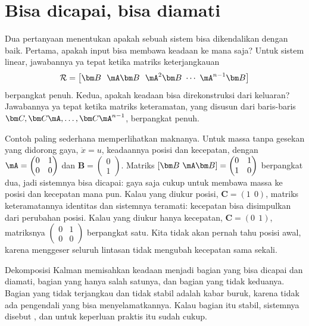 \section{Bisa dicapai, bisa diamati}

Dua pertanyaan menentukan apakah sebuah sistem bisa dikendalikan dengan baik. Pertama, apakah input bisa
membawa keadaan ke mana saja? Untuk sistem linear, jawabannya ya tepat ketika matriks keterjangkauan
\begin{equation}
\mathcal R=\big[\bm B\ \ \mA\bm B\ \ \mA^2\bm B\ \cdots\ \mA^{n-1}\bm B\big]
\end{equation}
berpangkat penuh. Kedua, apakah keadaan bisa direkonstruksi dari keluaran? Jawabannya ya tepat ketika matriks
keteramatan, yang disusun dari baris-baris $\bm C,\bm C\mA,\dots,\bm C\mA^{n-1}$, berpangkat penuh.

Contoh paling sederhana memperlihatkan maknanya. Untuk massa tanpa gesekan yang didorong gaya, $\ddot x=u$,
keadaannya posisi dan kecepatan, dengan
$\mA=\begin{pmatrix}0&1\\0&0\end{pmatrix}$ dan $\bm B=\begin{pmatrix}0\\1\end{pmatrix}$. Matriks
$[\bm B\ \mA\bm B]=\begin{pmatrix}0&1\\1&0\end{pmatrix}$ berpangkat dua, jadi sistemnya bisa dicapai: gaya
saja cukup untuk membawa massa ke posisi dan kecepatan mana pun. Kalau yang diukur posisi,
$\bm C=(1\ \ 0)$, matriks keteramatannya identitas dan sistemnya teramati: kecepatan bisa disimpulkan dari
perubahan posisi. Kalau yang diukur hanya kecepatan, $\bm C=(0\ \ 1)$, matriksnya
$\begin{pmatrix}0&1\\0&0\end{pmatrix}$ berpangkat satu. Kita tidak akan pernah tahu posisi awal, karena
menggeser seluruh lintasan tidak mengubah kecepatan sama sekali.

Dekomposisi Kalman memisahkan keadaan menjadi bagian yang bisa dicapai dan diamati, bagian yang hanya salah
satunya, dan bagian yang tidak keduanya. Bagian yang tidak terjangkau dan tidak stabil adalah kabar buruk,
karena tidak ada pengendali yang bisa menyelamatkannya. Kalau bagian itu stabil, sistemnya disebut
, dan untuk keperluan praktis itu sudah cukup.

